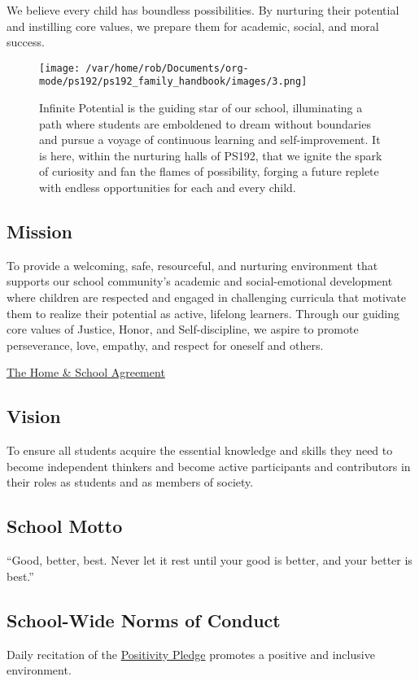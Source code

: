 \documentclass[letterpaper, 11pt]{article}
\begin{document}
We believe every child has boundless possibilities. By nurturing their potential and instilling core values, we prepare them for academic, social, and moral success.

\begin{figure}[htbp]
\centering
\texttt{[image: /var/home/rob/Documents/org-mode/ps192/ps192\_family\_handbook/images/3.png]}
\caption{Infinite Potential is the guiding star of our school, illuminating a path where students are emboldened to dream without boundaries and pursue a voyage of continuous learning and self-improvement. It is here, within the nurturing halls of PS192, that we ignite the spark of curiosity and fan the flames of possibility, forging a future replete with endless opportunities for each and every child.}
\end{figure}

\subsection{Mission}
\label{sec:orgd6f1687}
To provide a welcoming, safe, resourceful, and nurturing environment that supports our school community's academic and social-emotional development where children are respected and engaged in challenging curricula that motivate them to realize their potential as active, lifelong learners. Through our guiding core values of Justice, Honor, and Self-discipline, we aspire to promote perseverance, love, empathy, and respect for oneself and others.

\href{https://4.files.edl.io/d109/09/17/23/012751-34dac161-8e19-4033-8c6b-f369007cab02.pdf}{The Home \& School Agreement}

\subsection{Vision}
\label{sec:org6184e7e}
To ensure all students acquire the essential knowledge and skills they need to become independent thinkers and become active participants and contributors in their roles as students and as members of society.

\subsection{School Motto}
\label{sec:orgc786d00}

``Good, better, best. Never let it rest until your good is better, and your better is best.''

\subsection{School-Wide Norms of Conduct}
\label{sec:org6dc8271}
Daily recitation of the \href{https://www.ps192.org/apps/pages/index.jsp?uREC\_ID=1504973\&type=d\&pREC\_ID=2371090}{Positivity Pledge} promotes a positive and inclusive environment.
\end{document}
